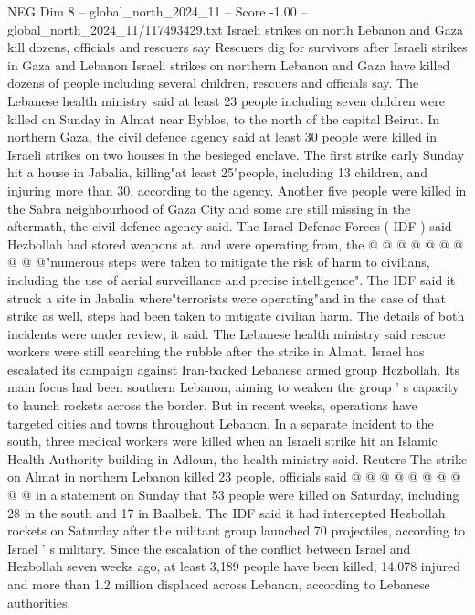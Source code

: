 \begin{textsample}{NEG Dim 8 – global\_north\_2024\_11 – Score -1.00 – global\_north\_2024\_11/117493429.txt}  \label{ex:f8_neg_302}
Israeli strikes on north Lebanon and Gaza kill dozens, officials and rescuers say Rescuers dig for survivors after Israeli strikes in Gaza and Lebanon Israeli strikes on northern Lebanon and Gaza have killed dozens of people including several children, rescuers and officials say.
The Lebanese health ministry said at least 23 people including seven children were killed on Sunday in Almat near Byblos, to the north of the capital Beirut.
In northern Gaza, the civil defence agency said at least 30 people were killed in Israeli strikes on two houses in the besieged enclave.
The first strike early Sunday hit a house in Jabalia, killing"at least 25"people, including 13 children, and injuring more than 30, according to the agency.
Another five people were killed in the Sabra neighbourhood of Gaza City and some are still missing in the aftermath, the civil defence agency said.
The Israel Defense Forces ( IDF ) said Hezbollah had stored weapons at, and were operating from, the @ @ @ @ @ @ @ @ @ @"numerous steps were taken to mitigate the risk of harm to civilians, including the use of aerial surveillance and precise intelligence".
The IDF said it struck a site in Jabalia where"terrorists were operating"and in the case of that strike as well, steps had been taken to mitigate civilian harm.
The details of both incidents were under review, it said.
The Lebanese health ministry said rescue workers were still searching the rubble after the strike in Almat.
Israel has escalated its campaign against Iran-backed Lebanese armed group Hezbollah.
Its main focus had been southern Lebanon, aiming to weaken the group ' s capacity to launch rockets across the border.
But in recent weeks, operations have targeted cities and towns throughout Lebanon.
In a separate incident to the south, three medical workers were killed when an Israeli strike hit an Islamic Health Authority building in Adloun, the health ministry said.
Reuters The strike on Almat in northern Lebanon killed 23 people, officials said @ @ @ @ @ @ @ @ @ @ in a statement on Sunday that 53 people were killed on Saturday, including 28 in the south and 17 in Baalbek.
The IDF said it had intercepted Hezbollah rockets on Saturday after the militant group launched 70 projectiles, according to Israel ' s military.
Since the escalation of the conflict between Israel and Hezbollah seven weeks ago, at least 3,189 people have been killed, 14,078 injured and more than 1.2 million displaced across Lebanon, according to Lebanese authorities.

\end{textsample}
